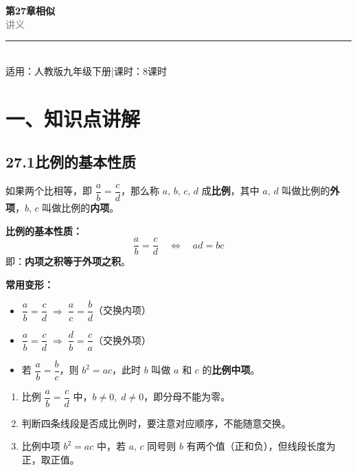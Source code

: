 \documentclass[12pt, a4paper]{ctexart}
\begin{document}
\begin{center}
{\Huge\bfseries\textcolor{mainblue}{第27章\quad 相似}}\\[12pt]
{\Large\textcolor{gray}{讲\quad 义}}\\[8pt]
\rule{0.6\textwidth}{1pt}\\[8pt]
{\normalsize 适用：人教版\quad 九年级下册\quad |\quad 课时：8课时}
\end{center}
\vspace{10pt}

\section*{\textcolor{mainblue}{一、知识点讲解}}

\subsection*{27.1\quad 比例的基本性质}

\begin{knowledgebox}[比例与比例的基本性质]
如果两个比相等，即 $\dfrac{a}{b}=\dfrac{c}{d}$，那么称 $a,\,b,\,c,\,d$ 成\textbf{比例}，其中 $a,\,d$ 叫做比例的\textbf{外项}，$b,\,c$ 叫做比例的\textbf{内项}。

\medskip
\textbf{比例的基本性质：}
\[
\frac{a}{b}=\frac{c}{d} \quad\Longleftrightarrow\quad ad=bc
\]
即：\textbf{内项之积等于外项之积}。

\medskip
\textbf{常用变形：}
\begin{itemize}[nosep]
  \item $\dfrac{a}{b}=\dfrac{c}{d}\;\Rightarrow\;\dfrac{a}{c}=\dfrac{b}{d}$（交换内项）
  \item $\dfrac{a}{b}=\dfrac{c}{d}\;\Rightarrow\;\dfrac{d}{b}=\dfrac{c}{a}$（交换外项）
  \item 若 $\dfrac{a}{b}=\dfrac{b}{c}$，则 $b^2=ac$，此时 $b$ 叫做 $a$ 和 $c$ 的\textbf{比例中项}。
\end{itemize}
\end{knowledgebox}

\begin{warnbox}[易错提醒]
\begin{enumerate}[nosep]
  \item 比例 $\dfrac{a}{b}=\dfrac{c}{d}$ 中，$b\neq0,\;d\neq0$，即分母不能为零。
  \item 判断四条线段是否成比例时，要注意对应顺序，不能随意交换。
  \item 比例中项 $b^2=ac$ 中，若 $a,\,c$ 同号则 $b$ 有两个值（正和负），但线段长度为正，取正值。
\end{enumerate}
\end{warnbox}
\end{document}
